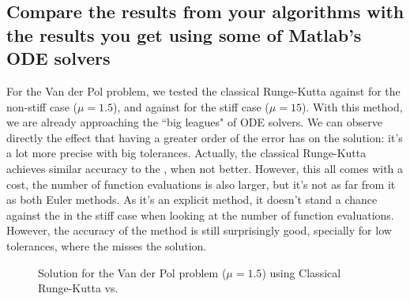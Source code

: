 \subsection{Compare the results from your algorithms with the results you get using some of Matlab's ODE solvers} \label{6_6}
For the Van der Pol problem, we tested the classical Runge-Kutta against  for the non-stiff case ($\mu = 1.5$), and against  for the stiff case ($\mu = 15$). With this method, we are already approaching the ``big leagues" of ODE solvers. We can observe directly the effect that having a greater order of the error has on the solution: it's a lot more precise with big tolerances. Actually, the classical Runge-Kutta achieves similar accuracy to the , when not better. However, this all comes with a cost, the number of function evaluations is also larger, but it's not as far from it as both Euler methods. As it's an explicit method, it doesn't stand a chance against the  in the stiff case when looking at the number of function evaluations. However, the accuracy of the method is still surprisingly good, specially for low tolerances, where the  misses the solution.

\begin{figure}[H]
    \centering
    \caption{Solution for the Van der Pol problem ($\mathit{\mu = 1.5}$) using Classical Runge-Kutta vs. }
    \label{6_6_mu_1_5}
\end{figure}

